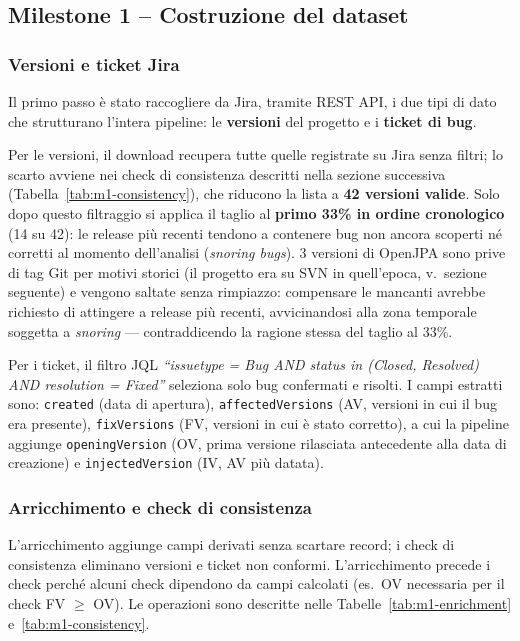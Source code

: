 \subsection{Milestone 1 -- Costruzione del dataset}

\subsubsection{Versioni e ticket Jira}

Il primo passo è stato raccogliere da Jira, tramite REST API, i due tipi di dato che
strutturano l'intera pipeline: le \textbf{versioni} del progetto e i \textbf{ticket di
bug}.

Per le versioni, il download recupera tutte quelle registrate su Jira senza filtri;
lo scarto avviene nei check di consistenza descritti nella sezione successiva
(Tabella~\ref{tab:m1-consistency}), che riducono la lista a \textbf{42 versioni valide}.
Solo dopo questo filtraggio si applica il taglio al \textbf{primo 33\% in ordine
cronologico} (14 su 42): le release più recenti tendono a contenere bug non ancora
scoperti né corretti al momento dell'analisi (\textit{snoring bugs}).
3 versioni di OpenJPA sono prive di tag Git per motivi storici (il progetto era su SVN
in quell'epoca, v.\ sezione seguente) e vengono saltate senza rimpiazzo: compensare le
mancanti avrebbe richiesto di attingere a release più recenti, avvicinandosi alla
zona temporale soggetta a \textit{snoring} — contraddicendo la ragione stessa del taglio al 33\%.


Per i ticket, il filtro JQL
\textit{``issuetype = Bug AND status in (Closed, Resolved) AND resolution = Fixed''}
seleziona solo bug confermati e risolti. I campi estratti sono: \texttt{created} (data di apertura),
\texttt{affectedVersions} (AV, versioni in cui il bug era presente),
\texttt{fixVersions} (FV, versioni in cui è stato corretto), a cui la pipeline aggiunge
\texttt{openingVersion} (OV, prima versione rilasciata antecedente alla data di creazione) e
\texttt{injectedVersion} (IV, AV più datata).

\subsubsection{Arricchimento e check di consistenza}

L'arricchimento aggiunge campi derivati senza scartare record; i check di consistenza
eliminano versioni e ticket non conformi. L'arricchimento precede i check perché alcuni
check dipendono da campi calcolati (es.\ OV necessaria per il check FV $\geq$ OV).
Le operazioni sono descritte nelle Tabelle~\ref{tab:m1-enrichment}
e~\ref{tab:m1-consistency}.

